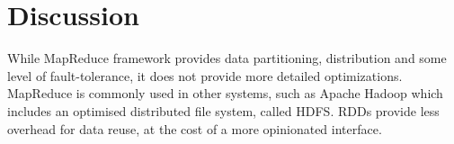 \chapter{Discussion\label{discussion}}

While MapReduce framework provides data partitioning, distribution and some level of fault-tolerance, it does not
provide more detailed optimizations. MapReduce is commonly used in other systems, such as Apache Hadoop which includes
an optimised distributed file system, called HDFS. RDDs provide less overhead for data reuse,
at the cost of a more opinionated interface.
